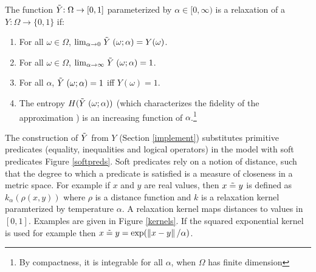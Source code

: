 
\begin{definition}
The function $\mathrel{\tilde{Y}} : \Omega \to [0, 1]$ parameterized by $\alpha \in [0, \infty)$ is a relaxation of a $Y: \Omega \to \{0, 1\}$ if:
\begin{enumerate}[label=(\roman*)]
	\label{def:temp}
	\item For all $\omega \in \Omega$, $\lim_{\alpha \to 0}\mathrel{\tilde{Y}}(\omega; \alpha) = Y(\omega)$.
	\item For all $\omega \in \Omega$, $\lim_{\alpha \to \infty}\mathrel{\tilde{Y}}(\omega; \alpha) = 1$.

    \item For all $\alpha$, $\mathrel{\tilde{Y}}(\omega; \alpha) = 1$ iff $Y(\omega) = 1$.
    \item The entropy $H(\mathrel{\tilde{Y}}(\omega; \alpha))$ (which characterizes the fidelity of the approximation ) is an increasing function of $\alpha$.\footnote
    {By compactness, it is integrable for all $\alpha$, when $\Omega$ has finite dimension}
\end{enumerate}
\end{definition}


The construction of $\mathrel{\tilde{Y}}$ from $Y$ (Section \ref{implement}) substitutes primitive predicates (equality, inequalities and logical operators) in the model with soft predicates Figure \ref{softpreds}.  Soft predicates rely on a notion of distance, such that the degree to which a predicate is satisfied is a measure of closeness in a metric space. 
For example if $x$ and $y$ are real values, then $x \mathrel{\tilde{=}} y$ is defined as $k_\alpha(\rho(x, y))$ where $\rho$ is a distance function and $k$ is a relaxation kernel paramterized by temperature $\alpha$.
A relaxation kernel maps distances to values in $[0, 1]$.
Examples are given in Figure \ref{kernels}.
If the squared exponential kernel is used for example then $x \mathrel{\tilde{=}} y = \exp(\left\|{{x - y}}\right\|/\alpha)$.

